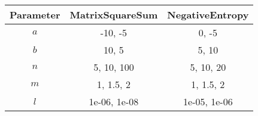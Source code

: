 \begin{center}
\label{tab:params_UniformSearch}
\begin{tabular}{|c|c|c|}
\hline
\rowcolor{gray!25}
Parameter & MatrixSquareSum & NegativeEntropy \\
\hline
$a$ & -10, -5 & 0, -5 \\
$b$ & 10, 5 & 5, 10 \\
$n$ & 5, 10, 100 & 5, 10, 20 \\
$m$ & 1, 1.5, 2 & 1, 1.5, 2 \\
$l$ & 1e-06, 1e-08 & 1e-05, 1e-06 \\
\hline
\end{tabular}
\end{center}


